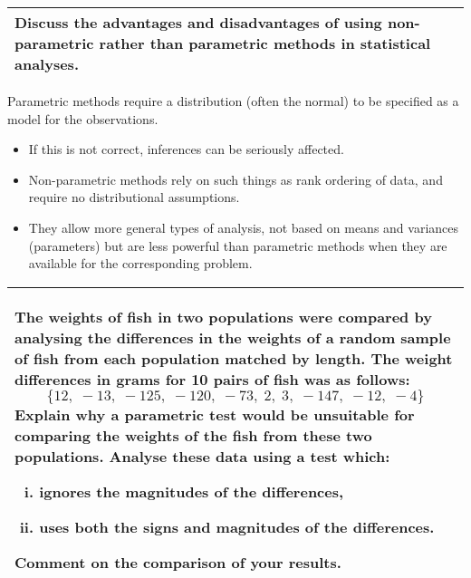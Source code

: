 \documentclass[a4paper,12pt]{article}
\begin{document}
	
	\begin{table}[ht!]
		
		\centering
		
		\begin{tabular}{|p{15cm}|}
			
			\hline  
			
			\large
			\noindent Discuss the advantages and disadvantages of using non-parametric rather than parametric methods in statistical analyses.
			\\ \hline
			
		\end{tabular}
		
	\end{table}
	\large
\noindent	Parametric methods require a distribution (often the normal) to be specified as a model for
	the observations. 
	\begin{itemize}
		\item If this is not correct, inferences can be seriously affected.\item Non-parametric methods
		rely on such things as rank ordering of data, and require no distributional assumptions. 
		\item They
		allow more general types of analysis, not based on means and variances (parameters) but are less
		powerful than parametric methods when they are available for the corresponding problem.
	\end{itemize}
	
	\newpage
	
	\begin{table}[ht!]
		
		\centering
		
		\begin{tabular}{|p{15cm}|}
			
			\hline  
			\large
			\noindent The weights of fish in two populations were compared by analysing the differences in the weights of a random sample of fish from each population matched by length.  The weight differences in grams for 10 pairs of fish was as follows:
			\[ \{12,\; -13,\;-125,\;-120,\;-73,\;2,\;3,\;-147,\;-12,\;-4 \}\]
			Explain why a parametric test would be unsuitable for comparing the weights of the fish from these two populations.
			Analyse these data using a test which:
			\begin{enumerate}[(i)]
				\item ignores the magnitudes of the differences,
				\item uses both the signs and magnitudes of the differences.
			\end{enumerate}
			Comment on the comparison of your results.
			
			\\ \hline
			
		\end{tabular}
		
	\end{table}
	
\end{document}
